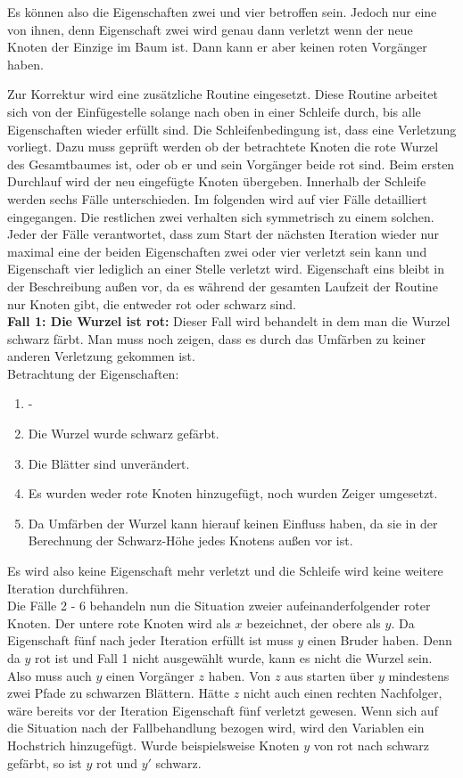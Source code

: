 \documentclass[a4paper,12pt]{article}
\begin{document}
\noindent Es können also die Eigenschaften zwei und vier betroffen sein. Jedoch nur eine von ihnen, denn Eigenschaft zwei wird genau dann verletzt wenn der neue Knoten der Einzige im Baum ist. Dann kann er aber keinen roten Vorgänger haben.

 \noindent Zur Korrektur wird eine zusätzliche Routine eingesetzt. Diese Routine arbeitet sich von der Einfügestelle solange nach oben in einer Schleife durch, bis alle Eigenschaften wieder erfüllt sind. Die Schleifenbedingung ist, dass eine Verletzung vorliegt. Dazu muss geprüft werden ob der betrachtete Knoten die rote Wurzel des Gesamtbaumes ist, oder ob er und sein Vorgänger beide rot sind. Beim ersten Durchlauf wird der neu eingefügte Knoten übergeben. Innerhalb der Schleife werden sechs Fälle unterschieden. Im folgenden wird auf vier Fälle detailliert eingegangen. Die restlichen zwei verhalten sich symmetrisch zu einem solchen. Jeder der Fälle verantwortet, dass zum Start der nächsten Iteration wieder nur maximal eine der beiden Eigenschaften zwei oder vier verletzt sein kann und Eigenschaft vier lediglich an einer Stelle verletzt wird.  Eigenschaft eins bleibt in der Beschreibung außen vor, da es während der gesamten Laufzeit der Routine nur Knoten gibt, die entweder rot oder schwarz sind. \\
 
\noindent\textbf{Fall 1: Die Wurzel ist rot: }
Dieser Fall wird behandelt in dem man die Wurzel schwarz färbt. Man muss noch zeigen, dass es durch das Umfärben zu keiner anderen Verletzung gekommen ist.\\

Betrachtung der Eigenschaften:
\begin{enumerate}
	\item -
	\item Die Wurzel wurde schwarz gefärbt.
	\item Die Blätter sind unverändert.
	\item Es wurden weder rote Knoten hinzugefügt, noch wurden Zeiger umgesetzt. 
	\item Da Umfärben der Wurzel kann hierauf keinen Einfluss haben, da sie in der Berechnung der Schwarz-Höhe jedes  Knotens außen vor ist.
\end{enumerate}  

\noindent Es wird also keine Eigenschaft mehr verletzt und die Schleife wird keine weitere Iteration durchführen.\\
 Die Fälle 2 - 6 behandeln nun die Situation zweier aufeinanderfolgender roter Knoten. Der untere rote Knoten wird als $x$ bezeichnet, der obere als $y$. Da Eigenschaft fünf nach jeder Iteration erfüllt ist muss $y$ einen Bruder haben. Denn da $y$ rot ist und Fall 1 nicht ausgewählt wurde, kann es nicht die Wurzel sein. Also muss auch $y$ einen Vorgänger $z$ haben. Von $z$ aus starten über $y$ mindestens zwei Pfade zu schwarzen Blättern. Hätte $z$ nicht auch einen rechten Nachfolger, wäre bereits vor der Iteration Eigenschaft fünf verletzt gewesen. Wenn sich auf die Situation nach der Fallbehandlung bezogen wird, wird den Variablen ein Hochstrich hinzugefügt. Wurde beispielsweise Knoten $y$ von rot nach schwarz gefärbt, so ist $y$ rot und $y'$ schwarz. \\
 
\end{document}
